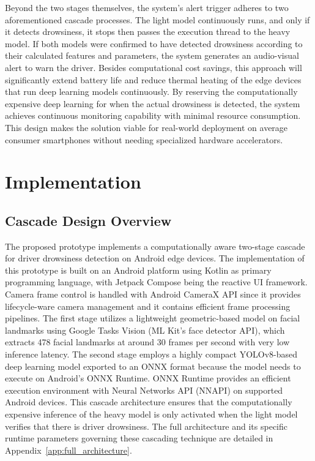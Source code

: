 \documentclass[pdflatex,sn-mathphys-num]{sn-jnl}
\theoremstyle{thmstyleone}%
\theoremstyle{thmstyletwo}%
\theoremstyle{thmstylethree}%
\begin{document}
	\bigskip
	
	Beyond the two stages themselves, the system’s alert trigger adheres to two aforementioned cascade processes. The light model continuously runs, and only if it detects drowsiness, it stops then passes the execution thread to the heavy model. If both models were confirmed to have detected drowsiness according to their calculated features and parameters, the system generates an audio-visual alert to warn the driver. Besides computational cost savings, this approach will significantly extend battery life and reduce thermal heating of the edge devices that run deep learning models continuously. By reserving the computationally expensive deep learning for when the actual drowsiness is detected, the system achieves continuous monitoring capability with minimal resource consumption. This design makes the solution viable for real-world deployment on average consumer smartphones without needing specialized hardware accelerators.
	
	\section{Implementation}\label{sec:impl}
	
	\subsection{Cascade Design Overview}\label{sec:cascade}
	The proposed prototype implements a computationally aware two-stage cascade for driver drowsiness detection on Android edge devices. The implementation of this prototype is built on an Android platform using Kotlin as primary programming language, with Jetpack Compose being the reactive UI framework. Camera frame control is handled with Android CameraX API since it provides lifecycle-ware camera management and it contains efficient frame processing pipelines.  The first stage utilizes a lightweight geometric-based model on facial landmarks using Google Tasks Vision (ML Kit’s face detector API), which extracts 478 facial landmarks at around 30 frames per second with very low inference latency. The second stage employs a highly compact YOLOv8-based deep learning model exported to an ONNX format because the model needs to execute on Android's ONNX Runtime. ONNX Runtime provides an efficient execution environment with Neural Networks API (NNAPI) on supported Android devices. This cascade architecture ensures that the computationally expensive inference of the heavy model is only activated  when the light model verifies that there is driver drowsiness. The full architecture and its specific runtime parameters governing these cascading technique are detailed in Appendix~\ref{app:full_architecture}.
	
\end{document}
